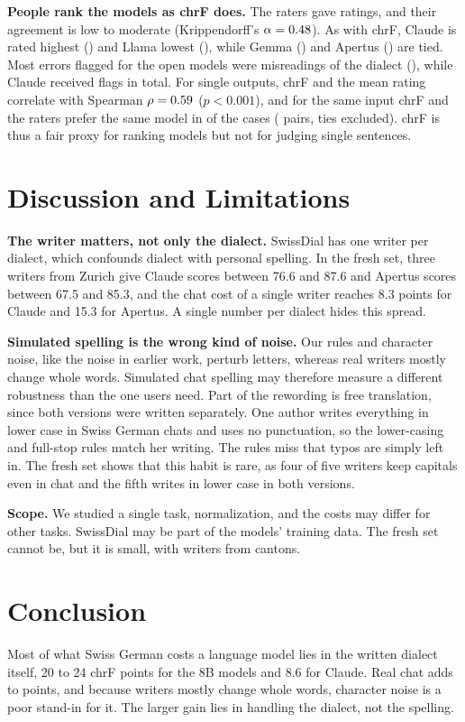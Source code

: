 \documentclass[11pt]{article}
\begin{document}
\textbf{People rank the models as chrF does.} The \Raters{} raters gave \RatingsN{} ratings, and their
agreement is low to moderate (Krippendorff's $\alpha = 0.48$). As with chrF, Claude is rated
highest (\RatingClaude) and Llama lowest (\RatingLlama), while Gemma (\RatingGemma) and Apertus
(\RatingApertus) are tied. Most errors flagged for the open models were misreadings of the
dialect (\OpenMisreadShare), while Claude received \ClaudeFlagged{} flags in total. For single outputs,
chrF and the mean rating correlate with Spearman $\rho = 0.59$ ($p < 0.001$), and for the
same input chrF and the raters prefer the same model in \RatingWinner{} of the cases
(\RatingWinnerN{} pairs, ties excluded). chrF is thus a fair proxy for ranking models but not for
judging single sentences.

\section{Discussion and Limitations}

\textbf{The writer matters, not only the dialect.} SwissDial has one writer per dialect, which
confounds dialect with personal spelling. In the fresh set, three writers from Zurich give Claude scores between 76.6 and 87.6 and Apertus scores between 67.5
and 85.3, and the chat cost of a single writer reaches 8.3 points for Claude and 15.3 for Apertus. A
single number per dialect hides this spread.

\textbf{Simulated spelling is the wrong kind of noise.} Our rules and character noise, like the noise
in earlier work, perturb letters, whereas real writers mostly change whole words. Simulated chat
spelling may therefore measure a different robustness than the one users need. Part of the rewording
is free translation, since both versions were written separately. One author writes everything in
lower case in Swiss German chats and uses no punctuation, so the lower-casing and full-stop rules
match her writing. The rules miss that typos are simply left in. The fresh set shows that this habit
is rare, as four of five writers keep capitals even in chat and the fifth writes in lower case in
both versions.

\textbf{Scope.} We studied a single task, normalization, and the costs may differ for other tasks.
SwissDial may be part of the models' training data. The fresh set cannot be, but it is small, with \FreshWriters{}
writers from \FreshNCantons{} cantons.

\section{Conclusion}
Most of what Swiss German costs a language model lies in the written dialect itself, 20 to 24 chrF
points for the 8B models and 8.6 for Claude. Real chat adds \FreshRealMin{} to \FreshRealMax{}
points, and because writers mostly change whole words, character noise is a poor stand-in for it.
The larger gain lies in handling the dialect, not the spelling.
\end{document}
